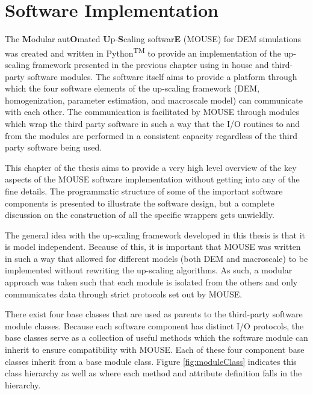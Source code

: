 \chapter{Software Implementation}

The \textbf{M}odular aut\textbf{O}mated \textbf{U}p-\textbf{S}caling softwar\textbf{E} (MOUSE) for DEM simulations was created and written in Python\textsuperscript{TM} to provide an implementation of the up-scaling framework presented in the previous chapter using in house and third-party software modules. The software itself aims to provide a platform through which the four software elements of the up-scaling framework (DEM, homogenization, parameter estimation, and macroscale model) can communicate with each other. The communication is facilitated by MOUSE through modules which wrap the third party software in such a way that the I/O routines to and from the modules are performed in a consistent capacity regardless of the third party software being used. 

This chapter of the thesis aims to provide a very high level overview of the key aspects of the MOUSE software implementation without getting into any of the fine details. The programmatic structure of some of the important software components is presented to illustrate the software design, but a complete discussion on the construction of all the specific wrappers gets unwieldly.

The general idea with the up-scaling framework developed in this thesis is that it is model independent. Because of this, it is important that MOUSE was written in such a way that allowed for different models (both DEM and macroscale) to be implemented without rewriting the up-scaling algorithms. As such, a modular approach was taken such that each module is isolated from the others and only communicates data through strict protocols set out by MOUSE.

There exist four base classes that are used as parents to the third-party software module classes. Because each software component has distinct I/O protocols, the base classes serve as a collection of useful methods which the software module can inherit to ensure compatibility with MOUSE. Each of these four component base classes inherit from a base module class. Figure \ref{fig:moduleClass} indicates this class hierarchy as well as where each method and attribute definition falls in the hierarchy.


